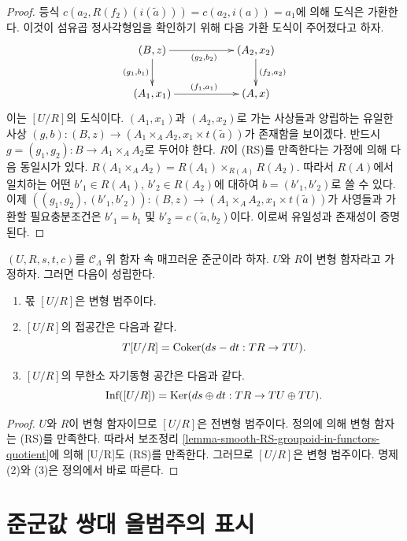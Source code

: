 \begin{proof}
\medskip\noindent
등식 $c(a_2, R(f_2)(i(\widetilde{a}))) = c(a_2, i(a)) = a_1$에 의해
도식은 가환한다. 이것이 섬유곱 정사각형임을 확인하기 위해
다음 가환 도식이 주어졌다고 하자.
$$
\xymatrix{
(B, z) \ar[d]_{(g_1, b_1)} \ar[rr]_{(g_2, b_2)} & & (A_2, x_2)
\ar[d]^{(f_2, a_2)} \\
(A_1, x_1) \ar[rr]^{(f_1, a_1)} & & (A, x)
}
$$
이는 $[U/R]$의 도식이다. $(A_1, x_1)$과 $(A_2, x_2)$로 가는
사상들과 양립하는 유일한 사상
$(g, b) : (B, z) \to (A_1 \times_A A_2, x_1 \times t(\widetilde{a}))$가
존재함을 보이겠다. 반드시
$g = (g_1, g_2) : B \to A_1 \times_A A_2$로 두어야 한다.
$R$이 (RS)를 만족한다는 가정에 의해 다음 동일시가 있다.
$R(A_1 \times_A A_2) = R(A_1) \times_{R(A)} R(A_2)$.
따라서 $R(A)$에서 일치하는 어떤
$b'_1 \in R(A_1)$, $b'_2 \in R(A_2)$에 대하여
$b = (b'_1, b'_2)$로 쓸 수 있다. 이제
$((g_1, g_2), (b'_1, b'_2)) : (B, z) \to
(A_1 \times_A A_2, x_1 \times t(\widetilde{a}))$가 사영들과 가환할
필요충분조건은 $b'_1 = b_1$ 및 $b'_2 = c(\widetilde{a}, b_2)$이다.
이로써 유일성과 존재성이 증명된다.
\end{proof}

\begin{lemma}
\label{lemma-deformation-groupoid-quotient}
$(U, R, s, t, c)$를 $\mathcal{C}_\Lambda$ 위 함자 속 매끄러운 준군이라
하자. $U$와 $R$이 변형 함자라고 가정하자. 그러면 다음이 성립한다.
\begin{enumerate}
\item 몫 $[U/R]$은 변형 범주이다.
\item $[U/R]$의 접공간은 다음과 같다.
$$
T[U/R] = \mathop{\mathrm{Coker}}(ds-dt: TR \to TU).
$$
\item $[U/R]$의 무한소 자기동형 공간은 다음과 같다.
$$
\text{Inf}([U/R]) =
\mathop{\mathrm{Ker}}(ds \oplus dt : TR \to TU \oplus TU).
$$
\end{enumerate}
\end{lemma}

\begin{proof}
$U$와 $R$이 변형 함자이므로 $[U/R]$은 전변형 범주이다.
정의에 의해 변형 함자는 (RS)를 만족한다.
따라서 보조정리 \ref{lemma-smooth-RS-groupoid-in-functors-quotient}에 의해
[U/R]도 (RS)를 만족한다. 그러므로 $[U/R]$은 변형 범주이다.
명제 (2)와 (3)은 정의에서 바로 따른다.
\end{proof}





\section{준군값 쌍대 올범주의 표시}
\label{section-presentation-categories-cofibred-in-groupoids}

